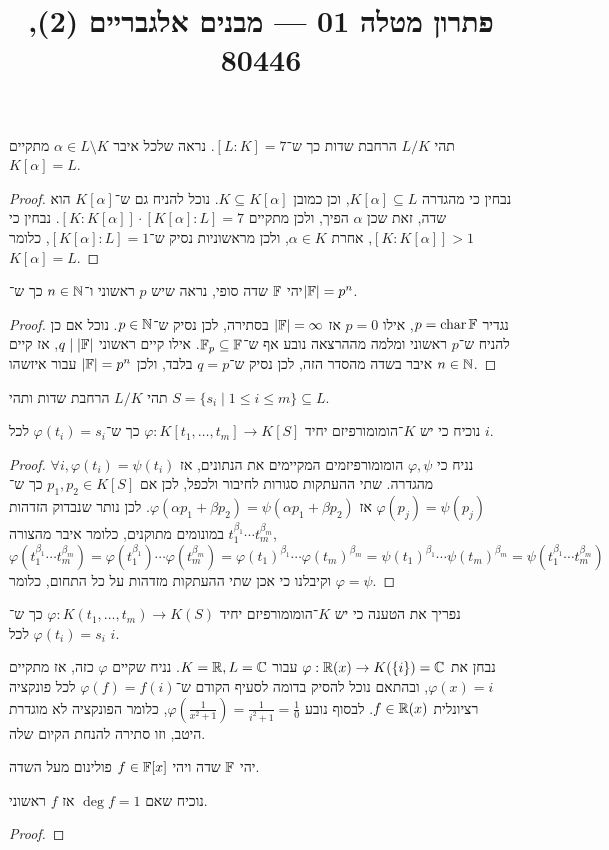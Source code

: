 
\title{פתרון מטלה 01 --- מבנים אלגבריים (2), 80446}


\maketitle
\maketitleprint{}

\question{}
תהי $L / K$ הרחבת שדות כך ש־$[L : K] = 7$.
נראה שלכל איבר $\alpha \in L \setminus K$ מתקיים $K[\alpha] = L$.
\begin{proof}
	נבחין כי מהגדרה $K[\alpha] \subseteq L$, וכן כמובן $K \subseteq K[\alpha]$.
	נוכל להניח גם ש־$K[\alpha]$ הוא שדה, זאת שכן $\alpha$ הפיך, ולכן מתקיים $[K : K[\alpha]] \cdot [K[\alpha] : L] = 7$.
	נבחין כי $[K : K[\alpha]] > 1$, אחרת $\alpha \in K$, ולכן מראשוניות נסיק ש־$[K[\alpha] : L] = 1$, כלומר $K[\alpha] = L$.
\end{proof}

\question{}
יהי $\mathbb{F}$ שדה סופי,
נראה שיש $p$ ראשוני ו־$n \in \mathbb{N}$ כך ש־$|\mathbb{F}| = p^n$.
\begin{proof}
	נגדיר $p = \operatorname{char} \mathbb{F}$, אילו $p = 0$ אז $|\mathbb{F}| = \infty$ בסתירה, לכן נסיק ש־$p \in \mathbb{N}$.
	נוכל אם כן להניח ש־$p$ ראשוני ומלמה מההרצאה נובע אף ש־$\mathbb{F}_p \subseteq \mathbb{F}$.
	אילו קיים ראשוני $q \mid |\mathbb{F}|$, אז קיים איבר בשדה מהסדר הזה, לכן נסיק ש־$q = p$ בלבד, ולכן $|\mathbb{F}| = p^n$ עבור איזשהו $n \in \mathbb{N}$.
\end{proof}

\question{}
תהי $L / K$ הרחבת שדות ותהי $S = \{ s_i \mid 1 \le i \le m \} \subseteq L$.

\subquestion{}
נוכיח כי יש $K$־הומומורפיזם יחיד $\varphi : K[t_1, \dots, t_m] \to K[S]$ כך ש־$\varphi(t_i) = s_i$ לכל $i$.
\begin{proof}
	נניח כי $\varphi, \psi$ הומומורפיזמים המקיימים את הנתונים, אז $\forall i, \varphi(t_i) = \psi(t_i)$ מהגדרה.
	שתי ההעתקות סגורות לחיבור ולכפל, לכן אם $p_1, p_2 \in K[S]$ כך ש־$\varphi(p_j) = \psi(p_j)$ אז $\varphi(\alpha p_1 + \beta p_2) = \psi(\alpha p_1 + \beta p_2)$.
	לכן נותר שנבדוק הזדהות במונומים מתוקנים, כלומר איבר מהצורה $t_1^{\beta_1} \cdots t_m^{\beta_m}$,
	\[
		\varphi(t_1^{\beta_1} \cdots t_m^{\beta_m})
		= \varphi(t_1^{\beta_1}) \cdots \varphi(t_m^{\beta_m})
		= {\varphi(t_1)}^{\beta_1} \cdots {\varphi(t_m)}^{\beta_m}
		= {\psi(t_1)}^{\beta_1} \cdots {\psi(t_m)}^{\beta_m}
		= \psi(t_1^{\beta_1} \cdots t_m^{\beta_m})
	\]
	וקיבלנו כי אכן שתי ההעתקות מזדהות על כל התחום, כלומר $\varphi = \psi$.
\end{proof}

\subquestion{}
נפריך את הטענה כי יש $K$־הומומורפיזם יחיד $\varphi : K(t_1, \dots, t_m) \to K(S)$ כך ש־$\varphi(t_i) = s_i$ לכל $i$.
\begin{solution}
	נבחן את $\varphi : \mathbb{R}(x) \to K(\{ i \}) = \mathbb{C}$ עבור $K = \mathbb{R}, L = \mathbb{C}$.
	נניח שקיים $\varphi$ כזה, אז מתקיים $\varphi(x) = i$, ובהתאם נוכל להסיק בדומה לסעיף הקודם ש־$\varphi(f) = f(i)$ לכל פונקציה רציונלית $f \in \mathbb{R}(x)$.
	לבסוף נובע $\varphi(\frac{1}{x^2 + 1}) = \frac{1}{i^2 + 1} = \frac{1}{0}$, כלומר הפונקציה לא מוגדרת היטב, וזו סתירה להנחת הקיום שלה.
\end{solution}

\question{}
יהי $\mathbb{F}$ שדה ויהי $f \in \mathbb{F}[x]$ פולינום מעל השדה.

\subquestion{}
נוכיח שאם $\deg f = 1$ אז $f$ ראשוני.
\begin{proof}
	
\end{proof}


